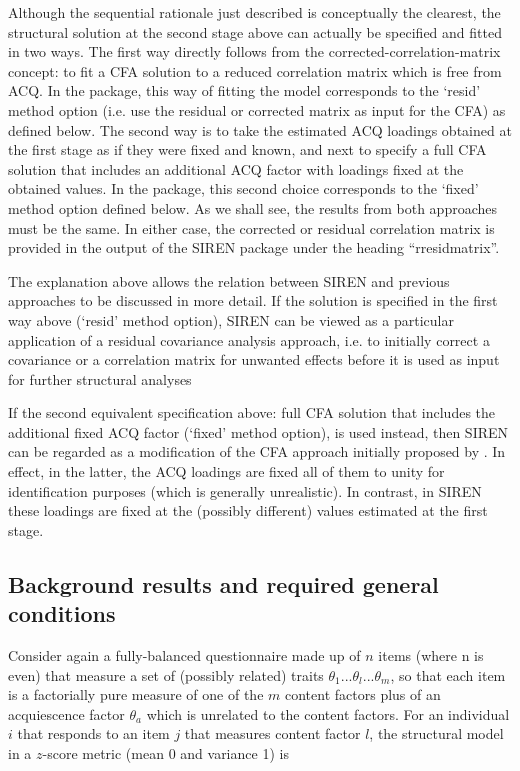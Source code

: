 Although the sequential rationale just described is conceptually the clearest, the structural solution at the second stage above can actually be specified and fitted in two ways. The first way directly follows from the corrected-correlation-matrix concept: to fit a CFA solution to a reduced correlation matrix which is free from ACQ. In the  package, this way of fitting the model corresponds to the ‘resid’ method option (i.e. use the residual or corrected matrix as input for the CFA) as defined below. The second way is to take the estimated ACQ loadings obtained at the first stage as if they were fixed and known, and next to specify a full CFA solution that includes an additional ACQ factor with loadings fixed at the obtained values. In the  package, this second choice corresponds to the ‘fixed’ method option defined below.  As we shall see, the results from both approaches must be the same. In either case, the corrected or residual correlation matrix is provided in the output of the SIREN package under the heading “rresidmatrix”.

The explanation above allows the relation between SIREN and previous approaches to be discussed in more detail. If the solution is specified in the first way above (‘resid’ method option), SIREN can be viewed as a particular application of a residual covariance analysis approach, i.e. to initially correct a covariance or a correlation matrix for unwanted effects before it is used as input for further structural analyses \citep[e.g.][] {Andrews:1984, Asparouhov:2023, DeCastellarnau:2021, tenBerge:1999}

If the second equivalent specification above: full CFA solution that includes the additional fixed ACQ factor (‘fixed’ method option), is used instead, then SIREN can be regarded as a modification of the CFA approach initially proposed by \citet{Billiet:2000}. In effect, in the latter, the ACQ loadings are fixed all of them to unity for identification purposes (which is generally unrealistic). In contrast, in SIREN these loadings are fixed at the (possibly different) values estimated at the first stage.

\subsection{Background results and required general conditions}

Consider again a fully-balanced questionnaire made up of $n$ items (where n is even) that measure a set of (possibly related) traits $\theta_1...\theta_l...\theta_m$, so that each item is a factorially pure measure of one of the $m$ content factors plus of an acquiescence factor $\theta_a$ which is unrelated to the content factors. For an individual $i$ that responds to an item $j$ that measures content factor $l$, the structural model in a $z$-score metric (mean 0 and variance 1) is

